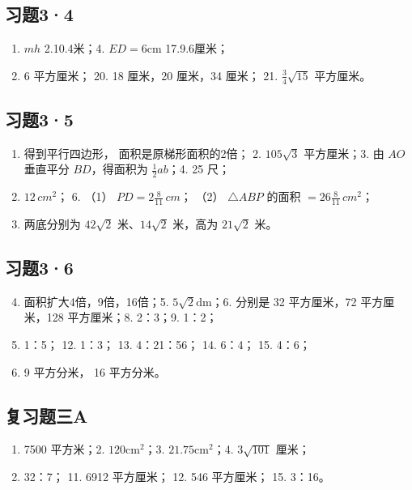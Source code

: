 \subsection{习题3·4}

\begin{enumerate}
\item
  \(mh\) 2.10.4米；4. \(ED = 6\mathrm{cm}\) 17.9.6厘米；
\item
  6 平方厘米； 20. 18 厘米，20 厘米，34 厘米； 21.
  \(\frac{3}{4}\sqrt{15}\) 平方厘米。
\end{enumerate}

\subsection{习题3·5}

\begin{enumerate}
\item
  得到平行四边形， 面积是原梯形面积的2倍； 2. \({105}\sqrt{3}\)
  平方厘米；3. 由 \(AO\) 垂直平分 \(BD\)，得面积为
  \(\frac{1}{2} ab\)；4. 25 尺；
\item
  \(12 \, cm^{2}\)； 6. （1） \(PD = 2\frac{8}{11} \, cm\)； （2）
  \(\triangle ABP\) 的面积 \(= 26\frac{8}{11} \, cm^{2}\)；
\item
  两底分别为 \(42\sqrt{2}\) 米、\(14\sqrt{2}\) 米，高为 \(21\sqrt{2}\)
  米。
\end{enumerate}

\subsection{习题3·6}

\begin{enumerate}
\setcounter{enumi}{3}
\item
  面积扩大4倍，9倍，16倍；5. \(5\sqrt{2}\mathrm{dm}\)；6. 分别是 32
  平方厘米，72 平方厘米，128 平方厘米；8. 2：3；9. 1：2；
\item
  1：5； 12. 1：3； 13. 4：21：56； 14. 6：4； 15. 4：6；
\item
  9 平方分米， 16 平方分米。
\end{enumerate}

\subsection{复习题三A}

\begin{enumerate}
\item
  7500 平方米；2. \(120\mathrm{cm}^2\)；3. \(21.75\mathrm{cm}^2\)；4.
  \(3\sqrt{101}\) 厘米；
\item
  32：7； 11. 6912 平方厘米； 12. 546 平方厘米； 15. 3：16。
\end{enumerate}

